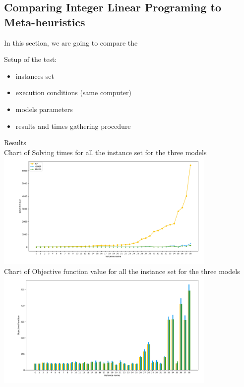 \subsection{Comparing Integer Linear Programing to Meta-heuristics}

In this section, we are going to compare the 

Setup of the test:\\
\begin{itemize}
	\item instances set
	\item execution conditions (same computer)
	\item models parameters
	\item results and times gathering procedure
\end{itemize}

Results\\
Chart of Solving times for all the instance set for the three models\\

\includegraphics[width=0.8\textwidth]{./img/ILPvsMetah_times_manual.png}\\[0.8cm] 


Chart of Objective function value for all the instance set for the three models\\


\includegraphics[width=0.8\textwidth]{./img/ILPvsMetah_objf_hist_manual.png}\\[0.8cm] 




\pagebreak
